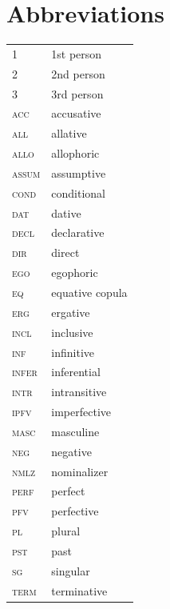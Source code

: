 \documentclass[output=paper]{langsci/langscibook}
\begin{document}
 

\section*{Abbreviations}
\begin{tabularx}{.45\textwidth}{lQ}
1	&	1st person	\\
2	&	2nd person	\\
3	&	3rd person	\\
\textsc{acc} 	&	accusative	\\
\textsc{all}	&	allative	\\
\textsc{allo}	&	allophoric	\\
\textsc{assum}	&	assumptive	\\
\textsc{cond}	&	conditional	\\
\textsc{dat}	&	dative	\\
\textsc{decl}	&	declarative	\\
\textsc{dir}	&	direct	\\
\textsc{ego}	&	egophoric	\\
\textsc{eq}	&	equative copula	\\
\textsc{erg}	&	ergative	\\
\textsc{incl}	&	inclusive	\\
\textsc{inf}	&	infinitive	\\
\textsc{infer}	&	inferential	\\
\textsc{intr}	&	intransitive	\\
\textsc{ipfv}	&	imperfective	\\
\textsc{masc}	&	masculine	\\
\textsc{neg}	&	negative	\\
\textsc{nmlz}	&	nominalizer	\\
\textsc{perf}	&	perfect	\\
\textsc{pfv}	&	perfective	\\
\textsc{pl}	&	plural	\\
\textsc{pst}	&	past	\\
\textsc{sg}	&	singular	\\
\textsc{term}	&	terminative	\\
\end{tabularx}



\sloppy
\printbibliography[heading=subbibliography,notkeyword=this] 
\end{document}
